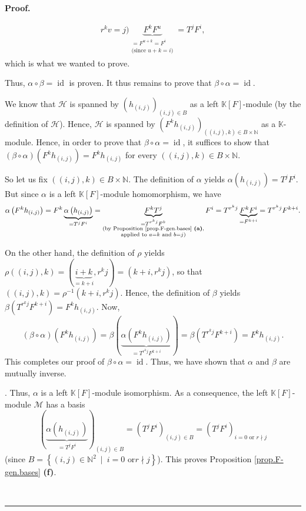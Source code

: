 \documentclass[numbers=enddot,12pt,final,onecolumn,notitlepage]{scrartcl}%
\theoremstyle{definition}
\newenvironment{proof}[1][Proof]{\noindent\textbf{#1.} }{\ \rule{0.5em}{0.5em}}
\begin{document}
\begin{proof}
{\begin{align*}
{{{}r^{k}v=j\text{)}}}\underbrace{F^{k}F^{u}}_{\substack{=F^{u+k}=F^{i}%
\\\text{(since }u+k=i\text{)}}}=T^{j}F^{i},
\end{align*}
which is what we wanted to prove.
\par
Thus, $\alpha\circ\beta=\operatorname*{id}$ is proven. It thus remains to
prove that $\beta\circ\alpha=\operatorname*{id}$.
\par
We know that $\mathcal{H}$ is spanned by $\left(  h_{\left(  i,j\right)
}\right)  _{\left(  i,j\right)  \in B}$ as a left $\mathbb{K}\left[  F\right]
$-module (by the definition of $\mathcal{H}$). Hence, $\mathcal{H}$ is spanned
by $\left(  F^{k}h_{\left(  i,j\right)  }\right)  _{\left(  \left(
i,j\right)  ,k\right)  \in B\times\mathbb{N}}$ as a $\mathbb{K}$-module.
Hence, in order to prove that $\beta\circ\alpha=\operatorname*{id}$, it
suffices to show that $\left(  \beta\circ\alpha\right)  \left(  F^{k}%
h_{\left(  i,j\right)  }\right)  =F^{k}h_{\left(  i,j\right)  }$ for every
$\left(  \left(  i,j\right)  ,k\right)  \in B\times\mathbb{N}$.
\par
So let us fix $\left(  \left(  i,j\right)  ,k\right)  \in B\times\mathbb{N}$.
The definition of $\alpha$ yields $\alpha\left(  h_{\left(  i,j\right)
}\right)  =T^{j}F^{i}$. But since $\alpha$ is a left $\mathbb{K}\left[
F\right]  $-module homomorphism, we have%
\[
\alpha\left(  F^{k}h_{\left(  i,j\right)  }\right)  =F^{k}\underbrace{\alpha
\left(  h_{\left(  i,j\right)  }\right)  }_{=T^{j}F^{i}}=\underbrace{F^{k}%
T^{j}}_{\substack{=T^{r^{k}j}F^{k}\\\text{(by Proposition
\ref{prop.F-gen.bases} \textbf{(a)},}\\\text{applied to }a=k\text{ and
}b=j\text{)}}}F^{i}=T^{r^{k}j}\underbrace{F^{k}F^{i}}_{=F^{k+i}}=T^{r^{k}%
j}F^{k+i}.
\]
\par
On the other hand, the definition of $\rho$ yields $\rho\left(  \left(
i,j\right)  ,k\right)  =\left(  \underbrace{i+k}_{=k+i},r^{k}j\right)
=\left(  k+i,r^{k}j\right)  $, so that $\left(  \left(  i,j\right)  ,k\right)
=\rho^{-1}\left(  k+i,r^{k}j\right)  $. Hence, the definition of $\beta$
yields $\beta\left(  T^{r^{k}j}F^{k+i}\right)  =F^{k}h_{\left(  i,j\right)  }%
$. Now,%
\[
\left(  \beta\circ\alpha\right)  \left(  F^{k}h_{\left(  i,j\right)  }\right)
=\beta\left(  \underbrace{\alpha\left(  F^{k}h_{\left(  i,j\right)  }\right)
}_{=T^{r^{k}j}F^{k+i}}\right)  =\beta\left(  T^{r^{k}j}F^{k+i}\right)
=F^{k}h_{\left(  i,j\right)  }.
\]
This completes our proof of $\beta\circ\alpha=\operatorname*{id}$. Thus, we
have shown that $\alpha$ and $\beta$ are mutually inverse.}. Thus, $\alpha$ is
a left $\mathbb{K}\left[  F\right]  $-module isomorphism. As a consequence,
the left $\mathbb{K}\left[  F\right]  $-module $\mathcal{M}$ has a basis
\[
\left(  \underbrace{\alpha\left(  h_{\left(  i,j\right)  }\right)  }%
_{=T^{j}F^{i}}\right)  _{\left(  i,j\right)  \in B}=\left(  T^{j}F^{i}\right)
_{\left(  i,j\right)  \in B}=\left(  T^{j}F^{i}\right)  _{i=0\text{ or }r\nmid
j}%
\]
(since $B=\left\{  \left(  i,j\right)  \in\mathbb{N}^{2}\ \mid\ i=0\text{ or
}r\nmid j\right\}  $). This proves Proposition \ref{prop.F-gen.bases}
\textbf{(f)}. \medskip


\end{proof}
\end{document}
